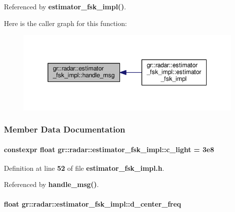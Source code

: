 Referenced by {\bf estimator\+\_\+fsk\+\_\+impl()}.



Here is the caller graph for this function\+:
\nopagebreak
\begin{figure}[H]
\begin{center}
\leavevmode
\includegraphics[width=338pt]{d3/d02/classgr_1_1radar_1_1estimator__fsk__impl_a99af7b27832b3d75854fc2680734b7f3_icgraph}
\end{center}
\end{figure}




\subsubsection{Member Data Documentation}
\paragraph[{c\+\_\+light}]{\setlength{\rightskip}{0pt plus 5cm}constexpr float gr\+::radar\+::estimator\+\_\+fsk\+\_\+impl\+::c\+\_\+light = 3e8\hspace{0.3cm}{\ttfamily [static]}}\label{classgr_1_1radar_1_1estimator__fsk__impl_aa0008b4f3ca7c68f13c14a3610d217d0}


Definition at line {\bf 52} of file {\bf estimator\+\_\+fsk\+\_\+impl.\+h}.



Referenced by {\bf handle\+\_\+msg()}.

\paragraph[{d\+\_\+center\+\_\+freq}]{\setlength{\rightskip}{0pt plus 5cm}float gr\+::radar\+::estimator\+\_\+fsk\+\_\+impl\+::d\+\_\+center\+\_\+freq}\label{classgr_1_1radar_1_1estimator__fsk__impl_a8ea4ec9c1f0eae795c73fc4a067bfe11}


